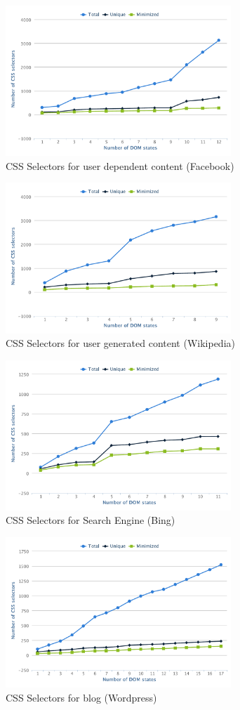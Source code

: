 		\begin{figure}
		\centering
		\includegraphics[width=85mm]{images/facebook.pdf}
		\caption{CSS Selectors for user dependent content (Facebook)}
		\label{Fig:Facebook}
	\end{figure}
	\begin{figure}
		\centering
		\includegraphics[width=85mm]{images/wikipedia.pdf}
		\caption{CSS Selectors for user generated content (Wikipedia)}
		\label{Fig:Wikipedia}
	\end{figure}
	\begin{figure}
		\centering
		\includegraphics[width=85mm]{images/bing.pdf}
		\caption{CSS Selectors for Search Engine (Bing)}
		\label{Fig:Bing}
	\end{figure}
	\begin{figure}
		\centering
		\includegraphics[width=85mm]{images/wordpress.pdf}
		\caption{CSS Selectors for blog (Wordpress)}
		\label{Fig:Wordpress}
	\end{figure}
